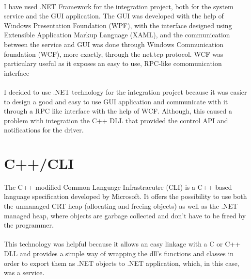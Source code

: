         \paragraph{}
        I have used .NET Framework for the integration project, both for the system service and the GUI application. The GUI was developed with
        the help of Windows Presentation Foundation (WPF), with the interface designed using Extensible Application Markup Language (XAML), and
        the communication between the service and GUI was done through Windows Communication foundation (WCF), more exactly, through the
        net.tcp protocol. WCF was particulary useful as it exposes an easy to use, RPC-like comomunication interface

        \paragraph{}
        I decided to use .NET technology for the integration project because it was easier to design a good and easy to use GUI application and
        communicate with it through a RPC like interface with the help of WCF. Although, this caused a problem with integration the C++ DLL that
        provided the control API and notifications for the driver.

    \section{C++/CLI}
        \paragraph{}
        The C++ modified Common Language Infrastracutre (CLI) is a C++ based language specification developed by Microsoft. It offers the possibility
        to use both the unmanaged CRT heap (allocating and freeing objects) as well as the .NET managed heap, where objects are garbage collected
        and don't have to be freed by the programmer.
        
        \paragraph{}
        This technology was helpful because it allows an easy linkage with a C or C++ DLL and provides a simple way of wrapping the dll's
        functions and classes in order to export them as .NET objects to .NET application, which, in this case, was a service.
    
